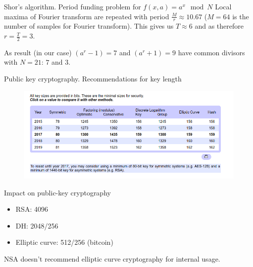 \documentclass[10pt,pdf,hyperref={unicode}]{beamer}
\begin{document}
\begin{frame}{Shor's algorithm. Period funding problem for
  $f\left(x, a\right) = a^x \mod{N}$}
  Local maxima of Fourier transform are repeated with period
  $\frac{M}{r} \approx 10.67$ ($M = 64$ is the number of samples for
  Fourier transform). This gives us $T\approx 6$ and as therefore
  $r=\frac{T}{2}=3$.

  As result (in our case)
  $(a^r-1) = 7$ and $(a^r + 1) = 9$ have common divisors with
  $N=21$: $7$ and $3$.
\end{frame}


\begin{frame}{Public key cryptography. Recommendations for key length}
 \begin{figure} 
   \includegraphics[width=120mm,scale=0.5]{keylengthcom.png}
  \end{figure}
\end{frame}

\begin{frame}{Impact on public-key cryptography}
\begin{itemize}
\item RSA: 4096
\item DH: 2048/256
\item Elliptic curve: 512/256 (bitcoin) 
\end{itemize}

NSA doesn't recommend elliptic curve cryptography for internal usage.
\end{frame}

\end{document}
